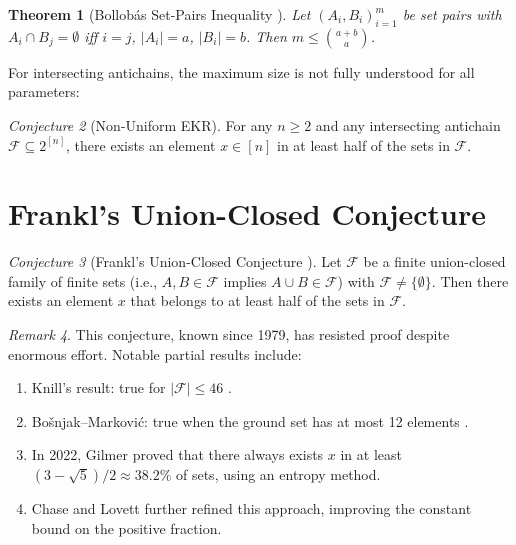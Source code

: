 \documentclass[12pt,a4paper]{amsart}
\newtheorem{theorem}{Theorem}[section]
\theoremstyle{definition}
\theoremstyle{remark}
\newtheorem{remark}[theorem]{Remark}
\newtheorem{conjecture}[theorem]{Conjecture}
\begin{document}
\begin{theorem}[Bollobás Set-Pairs Inequality \cite{Bollobas1965}]\label{thm:bollobas}
Let $(A_i, B_i)_{i=1}^m$ be set pairs with $A_i \cap B_j = \emptyset$ iff $i = j$,
$|A_i| = a$, $|B_i| = b$. Then $m \leq \binom{a+b}{a}$.
\end{theorem}

For intersecting antichains, the maximum size is not fully understood for all
parameters:

\begin{conjecture}[Non-Uniform EKR]\label{conj:non_uniform}
For any $n \geq 2$ and any intersecting antichain $\mathcal{F} \subseteq 2^{[n]}$,
there exists an element $x \in [n]$ in at least half of the sets in $\mathcal{F}$.
\end{conjecture}

\section{Frankl's Union-Closed Conjecture}\label{sec:union_closed}

\begin{conjecture}[Frankl's Union-Closed Conjecture \cite{Frankl1979}]\label{conj:frankl_uc}
Let $\mathcal{F}$ be a finite union-closed family of finite sets (i.e., $A, B \in \mathcal{F}$
implies $A \cup B \in \mathcal{F}$) with $\mathcal{F} \neq \{\emptyset\}$. Then
there exists an element $x$ that belongs to at least half of the sets in $\mathcal{F}$.
\end{conjecture}

\begin{remark}
This conjecture, known since 1979, has resisted proof despite enormous effort.
Notable partial results include:
\begin{enumerate}[label=(\roman*)]
  \item Knill's result: true for $|\mathcal{F}| \leq 46$ \cite{Knill1994}.
  \item Bošnjak--Marković: true when the ground set has at most 12 elements
        \cite{BosnjacMarkovic2008}.
  \item In 2022, Gilmer \cite{Gilmer2022} proved that there always exists $x$
        in at least $(3-\sqrt{5})/2 \approx 38.2\%$ of sets, using an entropy method.
  \item Chase and Lovett \cite{ChaseLovett2024} further refined this approach,
        improving the constant bound on the positive fraction.
\end{enumerate}
\end{remark}
\end{document}
